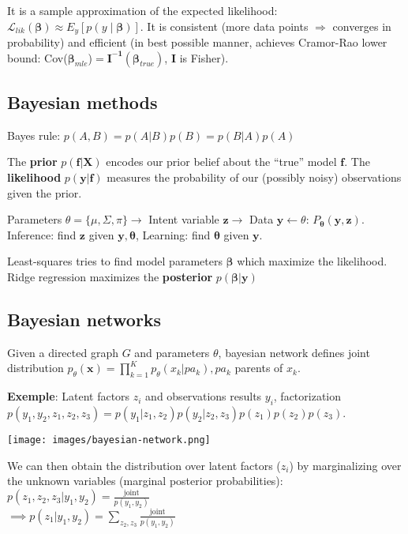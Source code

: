 \documentclass[10pt,a4paper,landscape]{article}
\renewcommand{\bf}[1]{\ensuremath{\mathbf{#1}}}
\newcommand{\bbeta}{\boldsymbol\beta}
\newcommand{\btheta}{\boldsymbol\theta}
\begin{document}
\begin{multicols*}{4}
It is a sample approximation of the expected likelihood:
$\mathcal{L}_{lik}(\bbeta) \approx E_y[ p(y \mid \bbeta) ]$.
It is consistent (more data points $\Rightarrow$ converges in probability) and efficient (in best possible manner, achieves Cramor-Rao lower bound: Cov($\bbeta_{mle}$)$=\bf{I^{-1}}(\bbeta_{true})$, $\bf{I}$ is Fisher).

\subsection{Bayesian methods}
Bayes rule: $p(A, B) = p(A|B) p(B) = p(B|A) p(A)$

The \textbf{prior} $p(\bf{f}|\bf{X})$ encodes our prior belief about the ``true'' model $\bf{f}$. The \textbf{likelihood} $p(\bf{y}|\bf{f})$ measures the probability of our (possibly noisy) observations given the prior.

Parameters $\theta = \{\mu, \Sigma, \pi\} \rightarrow$ Intent variable $\bf{z} \rightarrow$ Data $\bf{y} \leftarrow \theta$: $P_{\btheta} (\bf{y}, \bf{z})$. Inference: find $\bf{z}$ given $\bf{y}, \btheta$, Learning: find $\btheta$ given $\bf{y}$.

Least-squares tries to find model parameters $\bbeta$ which maximize the likelihood. Ridge regression maximizes the \textbf{posterior} $p(\bbeta|\bf{y})$

\subsection{Bayesian networks}
Given a directed graph $G$ and parameters $\theta$, bayesian network defines joint distribution $p_{\theta}(\bf{x}) = \prod_{k=1}^K p_{\theta}(x_k | pa_k), pa_k$ parents of $x_k$. 

\textbf{Exemple}: Latent factors $z_i$ and observations results $y_i$, factorization $p(y_1, y_2, z_1, z_2, z_3) = p(y_1 | z_1, z_2) p(y_2 | z_2, z_3) p(z_1) p(z_2) p(z_3)$.

\begin{colfig}
  \centering
  \texttt{[image: images/bayesian-network.png]}
\end{colfig}

We can then obtain the distribution over latent factors ($z_i$) by marginalizing over the unknown variables (marginal posterior probabilities):
$p(z_1, z_2, z_3 | y_1, y_2) = \frac{\text{joint}}{p(y_1, y_2)}$\\
$\implies p(z_1 | y_1, y_2) = \sum_{z_2, z_3} \frac{\text{joint}}{p(y_1, y_2)}$


\end{multicols*}
\end{document}
